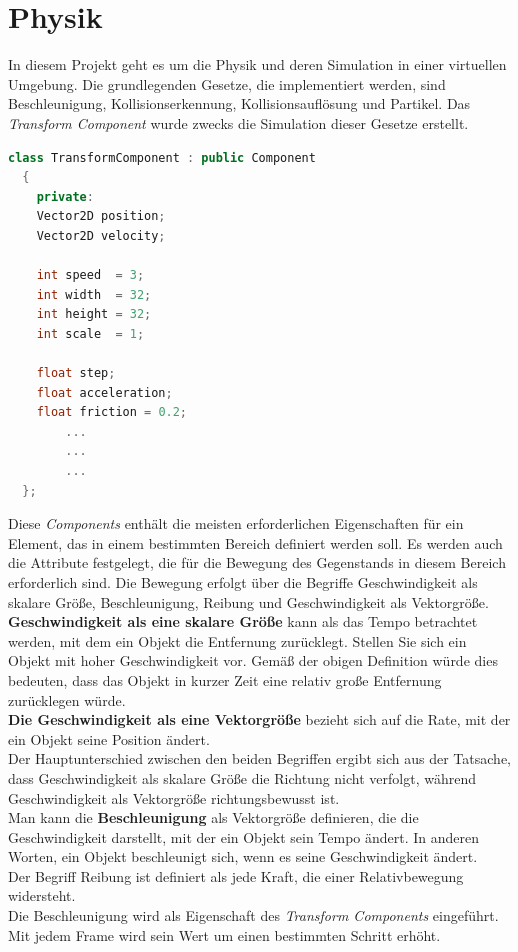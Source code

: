 \documentclass[
  10pt,
  a4paper,
  oneside,
  headers,
  headinclude,
  footinclude,
  BCOR5mm,
]{article}
\begin{document}
\section{Physik}
In diesem Projekt geht es um die Physik und deren Simulation in einer virtuellen
Umgebung. Die grundlegenden Gesetze, die implementiert werden, sind
Beschleunigung, Kollisionserkennung, Kollisionsauflösung und Partikel. Das
\textit{Transform Component} wurde zwecks die Simulation dieser Gesetze erstellt.

\begin{lstlisting}[language=C++]
  class TransformComponent : public Component
  {
    private:
    Vector2D position;
    Vector2D velocity;

    int speed  = 3;
    int width  = 32;
    int height = 32;
    int scale  = 1;

    float step;
    float acceleration;
    float friction = 0.2;
        ...
        ...
        ...
  };
\end{lstlisting}

Diese \textit{Components} enthält die meisten erforderlichen Eigenschaften für
ein Element, das in einem bestimmten Bereich definiert werden soll. Es werden
auch die Attribute festgelegt, die für die Bewegung des Gegenstands in diesem
Bereich erforderlich sind.
Die Bewegung erfolgt über die Begriffe Geschwindigkeit als skalare Größe,
Beschleunigung, Reibung und Geschwindigkeit als Vektorgröße. \\
\textbf{Geschwindigkeit als eine skalare Größe} kann als das Tempo betrachtet
werden, mit dem ein Objekt die Entfernung zurücklegt. Stellen Sie sich ein
Objekt mit hoher Geschwindigkeit vor. Gemäß der obigen Definition würde dies
bedeuten, dass das Objekt in kurzer Zeit eine relativ große Entfernung
zurücklegen würde. \\
\textbf{Die Geschwindigkeit als eine Vektorgröße} bezieht sich auf die Rate, mit
der ein Objekt seine Position ändert. \\
Der Hauptunterschied zwischen den beiden Begriffen ergibt sich aus der Tatsache,
dass Geschwindigkeit als skalare Größe die Richtung nicht verfolgt, während
Geschwindigkeit als Vektorgröße richtungsbewusst ist. \\
Man kann die \textbf{Beschleunigung} als Vektorgröße definieren, die die
Geschwindigkeit darstellt, mit der ein Objekt sein Tempo ändert. In anderen
Worten, ein Objekt beschleunigt sich, wenn es seine Geschwindigkeit ändert. \\
Der Begriff Reibung ist definiert als jede Kraft, die einer Relativbewegung
widersteht. \\
Die Beschleunigung wird als Eigenschaft des \textit{Transform Components}
eingeführt.
Mit jedem Frame wird sein Wert um einen bestimmten Schritt erhöht.
\end{document}
